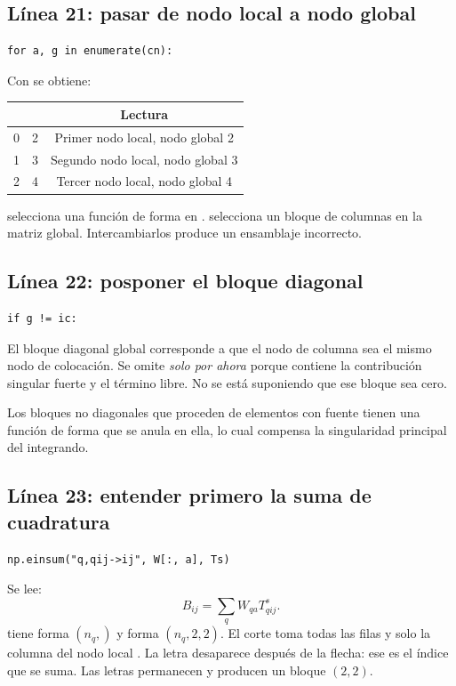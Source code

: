 \documentclass[11pt,a4paper]{article}
\numberwithin{equation}{section}
\DeclareRobustCommand{\code}[1]{\texttt{\detokenize{#1}}}
\begin{document}
\subsection{L\'inea 21: pasar de nodo local a nodo global}
\begin{lstlisting}
for a, g in enumerate(cn):
\end{lstlisting}
Con \code{cn=[2,3,4]} se obtiene:
\begin{center}
\begin{tabular}{ccc}
\toprule
\code{a} & \code{g} & Lectura\\
\midrule
0 & 2 & Primer nodo local, nodo global 2\\
1 & 3 & Segundo nodo local, nodo global 3\\
2 & 4 & Tercer nodo local, nodo global 4\\
\bottomrule
\end{tabular}
\end{center}
\code{a} selecciona una funci\'on de forma en \code{W}.
\code{g} selecciona un bloque de columnas en la matriz global.
Intercambiarlos produce un ensamblaje incorrecto.

\subsection{L\'inea 22: posponer el bloque diagonal}
\begin{lstlisting}
if g != ic:
\end{lstlisting}
El bloque diagonal global corresponde a que el nodo de columna sea
el mismo nodo de colocaci\'on.
Se omite \emph{solo por ahora} porque contiene la contribuci\'on
singular fuerte y el t\'ermino libre.
No se est\'a suponiendo que ese bloque sea cero.

Los bloques no diagonales que proceden de elementos con fuente
tienen una funci\'on de forma que se anula en ella, lo cual compensa
la singularidad principal del integrando.

\subsection{L\'inea 23: entender primero la suma de cuadratura}
\begin{lstlisting}
np.einsum("q,qij->ij", W[:, a], Ts)
\end{lstlisting}
Se lee:
\begin{equation}
 B_{ij}=\sum_qW_{qa}T^s_{qij}.
 \label{eq:einsum-estatico}
\end{equation}
\code{W[:,a]} tiene forma $(n_q,)$ y \code{Ts} forma $(n_q,2,2)$.
El corte \code{W[:,a]} toma todas las filas y solo la columna del nodo
local \code{a}.
La letra \code{q} desaparece despu\'es de la flecha:
ese es el \'indice que se suma.
Las letras \code{i,j} permanecen y producen un bloque $(2,2)$.
\end{document}
